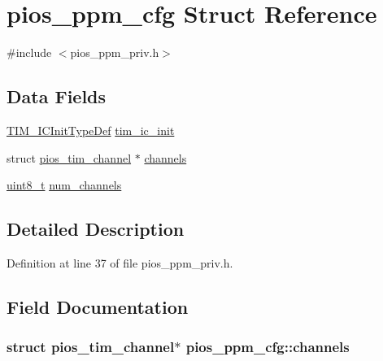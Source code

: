 \hypertarget{structpios__ppm__cfg}{\section{pios\-\_\-ppm\-\_\-cfg Struct Reference}
\label{structpios__ppm__cfg}
}


{\ttfamily \#include $<$pios\-\_\-ppm\-\_\-priv.\-h$>$}

\subsection*{Data Fields}
\begin{DoxyCompactItemize}
\item 
\hyperlink{struct_t_i_m___i_c_init_type_def}{T\-I\-M\-\_\-\-I\-C\-Init\-Type\-Def} \hyperlink{structpios__ppm__cfg_acecc33ca315a3edeb437b6073c1ec1b5}{tim\-\_\-ic\-\_\-init}
\item 
struct \hyperlink{structpios__tim__channel}{pios\-\_\-tim\-\_\-channel} $\ast$ \hyperlink{structpios__ppm__cfg_aab1a082565bf1af04ab81068736b569d}{channels}
\item 
\hyperlink{stdint_8h_aba7bc1797add20fe3efdf37ced1182c5}{uint8\-\_\-t} \hyperlink{structpios__ppm__cfg_a2b60f6cdabad556a4de0d2617cfe3309}{num\-\_\-channels}
\end{DoxyCompactItemize}


\subsection{Detailed Description}


Definition at line 37 of file pios\-\_\-ppm\-\_\-priv.\-h.



\subsection{Field Documentation}
\hypertarget{structpios__ppm__cfg_aab1a082565bf1af04ab81068736b569d}{
\subsubsection[{channels}]{\setlength{\rightskip}{0pt plus 5cm}struct {\bf pios\-\_\-tim\-\_\-channel}$\ast$ pios\-\_\-ppm\-\_\-cfg\-::channels}}\label{structpios__ppm__cfg_aab1a082565bf1af04ab81068736b569d}


